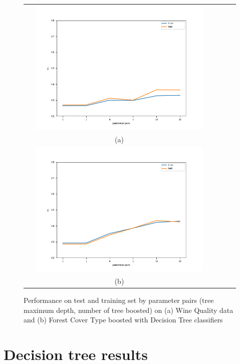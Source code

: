 \documentclass{article}
\begin{document}
\begin{figure} [H]
    \centering
    \begin{tabular}{cccc}
    \includegraphics[width=0.9\textwidth]{Results_LR/lr-wine-boosted_f1.png}\\
    (a) \\[6pt]
    \includegraphics[width=0.9\textwidth]{Results_LR/lr-covtype-boosted_f1.png}\\ (b)  \\[6pt]
    \end{tabular}
    \caption{Performance on test and training set by parameter pairs (tree maximum depth, number of tree boosted) on (a) Wine Quality data and (b) Forest Cover Type boosted with Decision Tree classifiers}
    \label{fig:Tree_results}
\end{figure}


\section{Decision tree results}
\label{Appendice_Tree}
\end{document}
